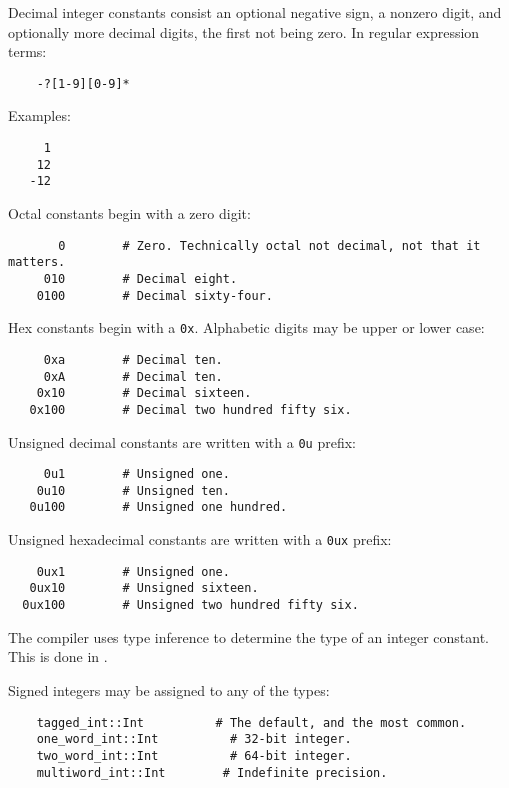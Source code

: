 Decimal integer constants consist an optional negative sign, a nonzero digit, 
and optionally more decimal digits, 
the first not being zero.  In regular expression terms:

\begin{verbatim}
    -?[1-9][0-9]*
\end{verbatim}

Examples:

\begin{verbatim}
     1
    12
   -12
\end{verbatim}


Octal constants begin with a zero digit:

\begin{verbatim}
       0        # Zero. Technically octal not decimal, not that it matters.
     010        # Decimal eight.  
    0100        # Decimal sixty-four.
\end{verbatim}

Hex constants begin with a {\tt 0x}.  Alphabetic digits may be upper or lower case:

\begin{verbatim}
     0xa        # Decimal ten.
     0xA        # Decimal ten.
    0x10        # Decimal sixteen.
   0x100        # Decimal two hundred fifty six.
\end{verbatim}

Unsigned decimal constants are written with a {\tt 0u} prefix:

\begin{verbatim}
     0u1        # Unsigned one.
    0u10        # Unsigned ten.
   0u100        # Unsigned one hundred.
\end{verbatim}

Unsigned hexadecimal constants are written with a {\tt 0ux} prefix:

\begin{verbatim}
    0ux1        # Unsigned one.
   0ux10        # Unsigned sixteen.
  0ux100        # Unsigned two hundred fifty six.
\end{verbatim}

The compiler uses type inference to determine the type 
of an integer constant.  This is done in 
.

Signed integers may be assigned to any of the types:
\begin{verbatim}
    tagged_int::Int          # The default, and the most common.
    one_word_int::Int          # 32-bit integer.
    two_word_int::Int          # 64-bit integer.
    multiword_int::Int        # Indefinite precision.
\end{verbatim}

